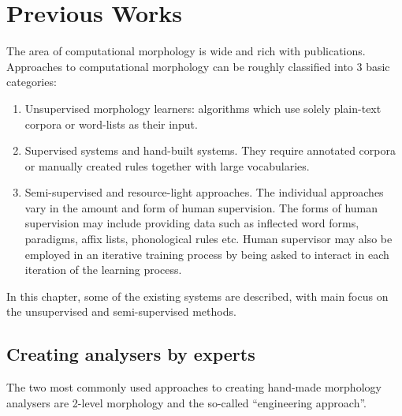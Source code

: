 \chapter{Previous Works}\label{chapter:prev_works}
\newcommand{\cprob}[2]{P(#1 | #2)}
The area of computational morphology is wide and rich with publications. Approaches to computational morphology can be roughly classified into 3 basic categories:
\begin{enumerate}
\item Unsupervised morphology learners: algorithms which use solely plain-text corpora or word-lists as their input.

\item Supervised systems and hand-built systems. They require annotated corpora or manually created rules together with large vocabularies.

\item Semi-supervised and resource-light approaches. The individual approaches vary in the amount and form of human supervision. The forms of human supervision may include providing data such as inflected word forms, paradigms, affix lists, phonological rules etc. Human supervisor may also be employed in an iterative training process by being asked to interact in each iteration of the learning process.
\end{enumerate}

In this chapter, some of the existing systems are described, with main focus on the unsupervised and semi-supervised methods.

\section{Creating analysers by experts}
The two most commonly used approaches to creating hand-made morphology analysers are 2-level morphology \citep{Koskenniemi83, Karttunen03} and the so-called ``engineering approach''.

